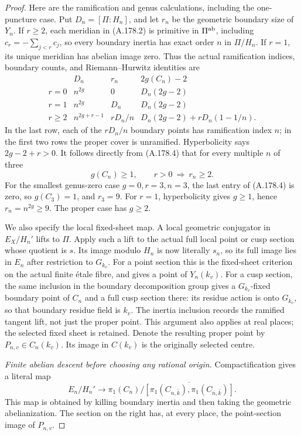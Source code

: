 \begin{proof}
Here are the ramification and genus calculations, including the
one-puncture case.  Put \(D_n=[\Pi:H_n]\), and let \(r_n\) be
the geometric boundary size of \(Y_n\).  If \(r\ge2\), each
meridian in (A.178.2) is primitive in \(\Pi^{\rm ab}\), including
\(c_r=-\sum_{j<r}c_j\), so every boundary inertia has exact
order \(n\) in \(\Pi/H_n\).  If \(r=1\), its unique meridian
has abelian image zero.  Thus the actual ramification indices,
boundary counts, and Riemann--Hurwitz identities are
\[
 \begin{array}{c|c|c|c}
  &D_n&r_n&2g(C_n)-2\\ \hline
 r=0&n^{2g}&0&D_n(2g-2)\\
 r=1&n^{2g}&D_n&D_n(2g-2)\\
 r\ge2&n^{2g+r-1}&rD_n/n&
                 D_n(2g-2)+rD_n(1-1/n).
 \end{array}
\tag{A.178.4}
\]
In the last row, each of the \(rD_n/n\) boundary points has
ramification index \(n\); in the first two rows the proper cover
is unramified.  Hyperbolicity says \(2g-2+r>0\).  It follows
directly from (A.178.4) that for every multiple \(n\) of three
\[
       g(C_n)\ge1,\qquad
       r>0\ \Longrightarrow\ r_n\ge2.
\tag{A.178.5}
\]
For the smallest genus-zero case \(g=0,r=3,n=3\), the last
entry of (A.178.4) is zero, so \(g(C_3)=1\), and \(r_3=9\).
For \(r=1\), hyperbolicity gives \(g\ge1\), hence \(r_n=n^{2g}
\ge9\).  The proper case has \(g\ge2\).

We also specify the local fixed-sheet map.  A local geometric
conjugator in \(E_X/H_n'\) lifts to \(\Pi\).  Apply such a lift
to the actual full local point or cusp section whose quotient
is \(s\).  Its image modulo \(H_n\) is now literally \(s_n\),
so its full image lies in \(E_n\) after restriction to \(G_{k_v}\).
For a point section this is the fixed-sheet criterion on the
actual finite étale fibre, and gives a point of \(Y_n(k_v)\).
For a cusp section, the same inclusion in the boundary
decomposition group gives a \(G_{k_v}\)-fixed boundary point
of \(C_n\) and a full cusp section there: its residue action
is onto \(G_{k_v}\), so that boundary residue field is \(k_v\).
The inertia inclusion records the ramified tangent lift, not
just the proper point.  This argument also applies at real
places; the selected fixed sheet is retained.  Denote the
resulting proper point by \(P_{n,v}\in C_n(k_v)\).
Its image in \(C(k_v)\) is the originally selected centre.

\emph{Finite abelian descent before choosing any rational origin.}
Compactification gives a literal map
\[
 E_n/H_n'\longrightarrow
 \pi_1(C_n)\big/
          \overline{[\pi_1(C_{n,\bar k}),\pi_1(C_{n,\bar k})]}.
\tag{A.178.6}
\]
This map is obtained by killing boundary inertia and then taking
the geometric abelianization.  The section on the right has,
at every place, the point-section image of \(P_{n,v}\).


\end{proof}
